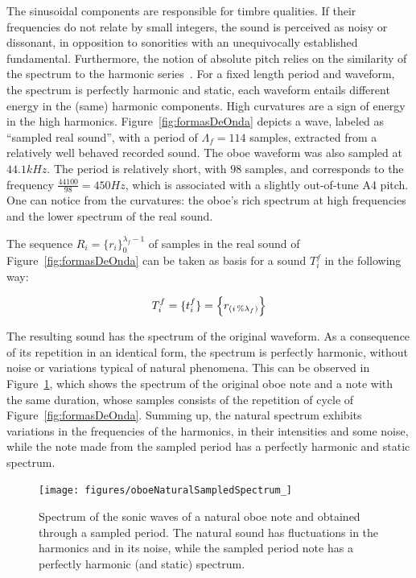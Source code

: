 The sinusoidal components are responsible for timbre qualities. If their frequencies do not relate by small integers, the sound is perceived as noisy or dissonant, in opposition to sonorities with an unequivocally established fundamental. Furthermore, the notion of absolute pitch relies on the similarity of the spectrum to the harmonic series~\cite{Roederer}. For a fixed length period and waveform, the spectrum is perfectly harmonic and static, each waveform entails different energy in the (same) harmonic components. High curvatures are a sign of energy in the high harmonics. Figure~\ref{fig:formasDeOnda} depicts a wave, labeled as ``sampled real sound'', with a period of $\Lambda_f=114$ samples, extracted from a relatively well behaved recorded sound. The oboe waveform was also sampled at $44.1kHz$. The period is relatively short, with $98$ samples, and corresponds to the frequency $\frac{44100}{98}=450Hz$, which is associated with a slightly out-of-tune A4 pitch. One can notice from the curvatures: the oboe's rich spectrum at high frequencies and the lower spectrum of the real sound.

The sequence $R_i=\{ r_i \}_0^{\lambda_f-1}$ of samples in the real sound of Figure~\ref{fig:formasDeOnda} can be taken as basis for a sound $T_i^f$ in the following way: 

\begin{equation}\label{sampleandoFormaDeOnda}
     T^f_i=\{ t_i^f \}=\Bigl\{ r_{(i\,\%\lambda_{f})} \Bigr\}
\end{equation}

The resulting sound has the spectrum of the original waveform. As a consequence of its repetition in an identical form, the spectrum is perfectly harmonic, without noise or variations typical of natural phenomena. This can be observed in Figure~\ref{fig:espectroOboe}, which shows the spectrum of the original oboe note and a note with the same duration, whose samples consists of the repetition of cycle of Figure~\ref{fig:formasDeOnda}. Summing up, the natural spectrum exhibits variations in the frequencies of the harmonics, in their intensities and some noise, while the note made from the sampled period has a perfectly harmonic and static spectrum.

\begin{figure}
    \centering
        \texttt{[image: figures/oboeNaturalSampledSpectrum\_]}
	\caption{Spectrum of the sonic waves of a natural oboe note and obtained through a sampled period. The natural sound has fluctuations in the harmonics and in its noise, while the sampled period note has a perfectly harmonic (and static) spectrum.}
        \label{fig:espectroOboe}
\end{figure}

